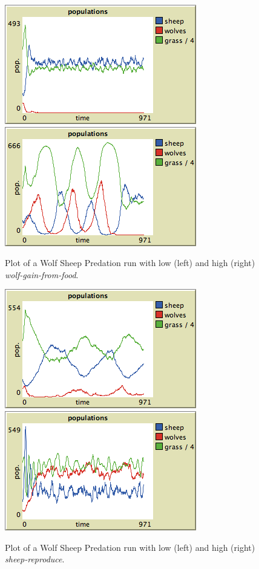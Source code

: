 \begin{figure}[ht]
\centering
\includegraphics[scale=.666667]{images/wolfsheep/wolffood_low.png}
\includegraphics[scale=.666667]{images/wolfsheep/wolffood_high.png}
\caption{Plot of a Wolf Sheep Predation run with low (left) and high (right) \textit{wolf-gain-from-food}.}
\label{fig:wsp_wolffood}
\end{figure}


\begin{figure}[ht]
\centering
\includegraphics[scale=.666667]{images/wolfsheep/sheepsex_low.png}
\includegraphics[scale=.666667]{images/wolfsheep/sheepsex_high.png}
\caption{Plot of a Wolf Sheep Predation run with low (left) and high (right) \textit{sheep-reproduce}.}
\label{fig:wsp_sheepsex}
\end{figure}


